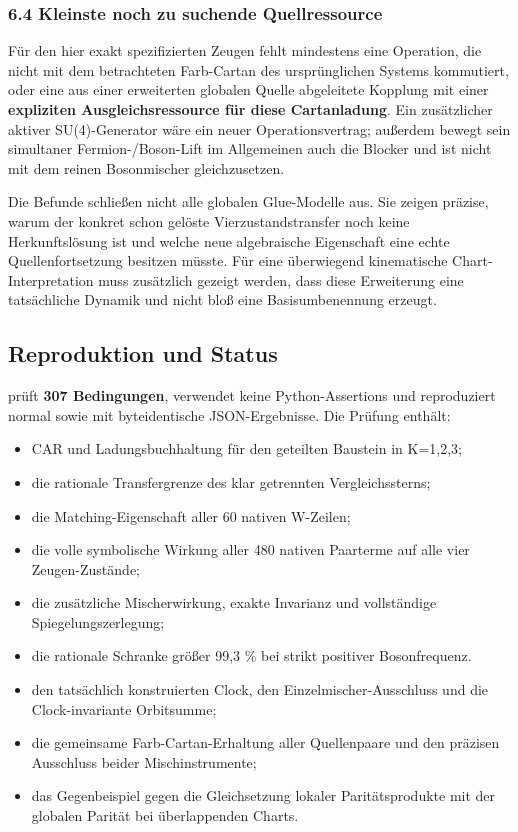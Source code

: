 \subsubsection{6.4 Kleinste noch zu suchende
Quellressource}\label{kleinste-noch-zu-suchende-quellressource}

Für den hier exakt spezifizierten Zeugen fehlt mindestens eine
Operation, die nicht mit dem betrachteten Farb-Cartan des ursprünglichen
Systems kommutiert, oder eine aus einer erweiterten globalen Quelle
abgeleitete Kopplung mit einer \textbf{expliziten Ausgleichsressource
für diese Cartanladung}. Ein zusätzlicher aktiver SU(4)-Generator wäre
ein neuer Operationsvertrag; außerdem bewegt sein simultaner
Fermion-/Boson-Lift im Allgemeinen auch die Blocker und ist nicht mit
dem reinen Bosonmischer gleichzusetzen.

Die Befunde schließen nicht alle globalen Glue-Modelle aus. Sie zeigen
präzise, warum der konkret schon gelöste Vierzustandstransfer noch keine
Herkunftslösung ist und welche neue algebraische Eigenschaft eine echte
Quellenfortsetzung besitzen müsste. Für eine überwiegend kinematische
Chart-Interpretation muss zusätzlich gezeigt werden, dass diese
Erweiterung eine tatsächliche Dynamik und nicht bloß eine
Basisumbenennung erzeugt.

\subsection{Reproduktion und Status}\label{reproduktion-und-status-1}

 prüft \textbf{307 Bedingungen}, verwendet keine
Python-Assertions und reproduziert normal sowie mit 
byteidentische JSON-Ergebnisse. Die Prüfung enthält:

\begin{itemize}
\tightlist
\item
  CAR und Ladungsbuchhaltung für den geteilten Baustein in K=1,2,3;
\item
  die rationale Transfergrenze des klar getrennten Vergleichssterns;
\item
  die Matching-Eigenschaft aller 60 nativen W-Zeilen;
\item
  die volle symbolische Wirkung aller 480 nativen Paarterme auf alle
  vier Zeugen-Zustände;
\item
  die zusätzliche Mischerwirkung, exakte Invarianz und vollständige
  Spiegelungszerlegung;
\item
  die rationale Schranke größer 99,3 \% bei strikt positiver
  Bosonfrequenz.
\item
  den tatsächlich konstruierten Clock, den Einzelmischer-Ausschluss und
  die Clock-invariante Orbitsumme;
\item
  die gemeinsame Farb-Cartan-Erhaltung aller Quellenpaare und den
  präzisen Ausschluss beider Mischinstrumente;
\item
  das Gegenbeispiel gegen die Gleichsetzung lokaler Paritätsprodukte mit
  der globalen Parität bei überlappenden Charts.
\end{itemize}

